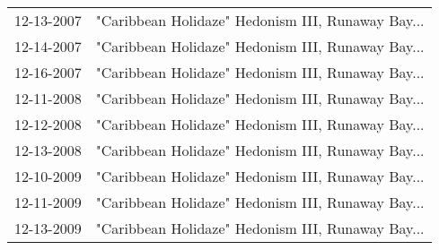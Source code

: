 \begin{supertabular}{ll}
 12-13-2007 &  "Caribbean Holidaze" Hedonism III, Runaway Bay... \\
 12-14-2007 &  "Caribbean Holidaze" Hedonism III, Runaway Bay... \\
 12-16-2007 &  "Caribbean Holidaze" Hedonism III, Runaway Bay... \\
 12-11-2008 &  "Caribbean Holidaze" Hedonism III, Runaway Bay... \\
 12-12-2008 &  "Caribbean Holidaze" Hedonism III, Runaway Bay... \\
 12-13-2008 &  "Caribbean Holidaze" Hedonism III, Runaway Bay... \\
 12-10-2009 &  "Caribbean Holidaze" Hedonism III, Runaway Bay... \\
 12-11-2009 &  "Caribbean Holidaze" Hedonism III, Runaway Bay... \\
 12-13-2009 &  "Caribbean Holidaze" Hedonism III, Runaway Bay... \\
\end{supertabular}
